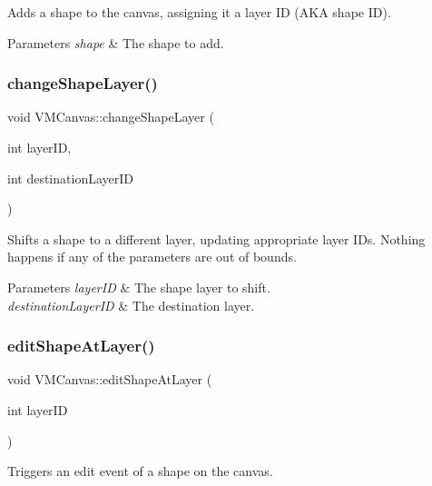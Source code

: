 Adds a shape to the canvas, assigning it a layer ID (A\+KA shape ID). 


\begin{DoxyParams}{Parameters}
{\em shape} & The shape to add. \\
\hline
\end{DoxyParams}
\mbox{\label{class_v_m_canvas_afaf8c4eae3d74035b250e95bd7d03ea3}} 
\subsubsection{\texorpdfstring{changeShapeLayer()}{changeShapeLayer()}}
{\footnotesize\ttfamily void V\+M\+Canvas\+::change\+Shape\+Layer (\begin{DoxyParamCaption}\item[{int}]{layer\+ID,  }\item[{int}]{destination\+Layer\+ID }\end{DoxyParamCaption})}



Shifts a shape to a different layer, updating appropriate layer I\+Ds. Nothing happens if any of the parameters are out of bounds. 


\begin{DoxyParams}{Parameters}
{\em layer\+ID} & The shape layer to shift. \\
\hline
{\em destination\+Layer\+ID} & The destination layer. \\
\hline
\end{DoxyParams}
\mbox{\label{class_v_m_canvas_a6eeef544d176c394bad40cecde432938}} 
\subsubsection{\texorpdfstring{editShapeAtLayer()}{editShapeAtLayer()}}
{\footnotesize\ttfamily void V\+M\+Canvas\+::edit\+Shape\+At\+Layer (\begin{DoxyParamCaption}\item[{int}]{layer\+ID }\end{DoxyParamCaption})}



Triggers an edit event of a shape on the canvas. 


